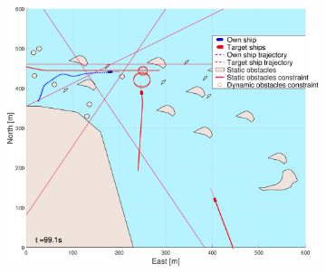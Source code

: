 \begin{figure}[!ht]
\begin{subfigure}[b]{0.494\textwidth}
        \subcaption{}
    \end{subfigure}
    \hfill
    \\
    \begin{subfigure}[b]{0.494\textwidth}
        \centering
        \includegraphics[width=\textwidth]{Images/NewFigures/skjergard_m_trafikk_NEW/_Simple_1fig1_time=100}
        \subcaption{}
    \end{subfigure}
    \hfill
    \begin{subfigure}[b]{0.494\textwidth}
        \centering

\end{subfigure}
\end{figure}
